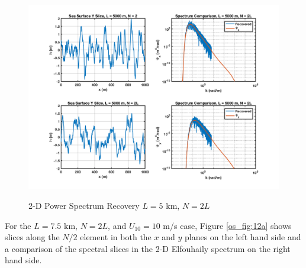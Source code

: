 \begin{figure}[H]
  \begin{center}
\includegraphics[width=6in]{../media/Ocean_Surface/sea_surface_2d_slices_5000.png}
  \end{center}
  \renewcommand{\baselinestretch}{1} \small\normalsize
  \begin{quote}
    \caption[2-D Power Spectrum Recovery $L = 5$ km, $N = 2L$]{2-D Power Spectrum Recovery $L = 5$ km, $N = 2L$\label{os_fig:11a}}
  \end{quote}
\end{figure}
\renewcommand{\baselinestretch}{2} \small\normalsize
 
For the $L = 7.5$ km, $N = 2L$, and $U_{10} = 10$ m/s case, Figure \ref{os_fig:12a} shows slices along the $N/2$ element in both the $x$ and $y$ planes on the left hand side and a comparison of the spectral slices in the 2-D Elfouhaily spectrum on the right hand side.

